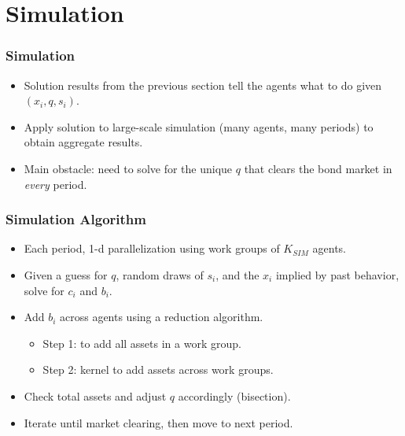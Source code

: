 \documentclass[handout]{beamer}
\theoremstyle{definition}
\begin{document}

\section{Simulation}

\begin{frame}
  \frametitle{Simulation}
  \begin{itemize}[<+->]
  \item Solution results from the previous section tell the agents what to do given $(x_i, q, s_i)$.
  \item Apply solution to large-scale simulation (many agents, many periods) to obtain aggregate results.
  \item Main obstacle: need to solve for the unique $q$ that clears the bond market in \emph{every} period.
  \end{itemize}
\end{frame}

\begin{frame}
  \frametitle{Simulation Algorithm}
  \begin{itemize}[<+->]
  \item Each period, 1-d parallelization using work groups of $K_{SIM}$ agents.
  \item Given a guess for $q$, random draws of $s_i$, and the $x_i$ implied by past behavior, solve for $c_i$ and $b_i$.
  \item Add $b_i$ across agents using a reduction algorithm.
    \begin{itemize}[<+->]
    \item Step 1: to add all assets in a work group.
    \item Step 2: kernel to add assets across work groups.
    \end{itemize}
  \item Check total assets and adjust $q$ accordingly (bisection).
  \item Iterate until market clearing, then move to next period.
  \end{itemize}
\end{frame}
\end{document}
